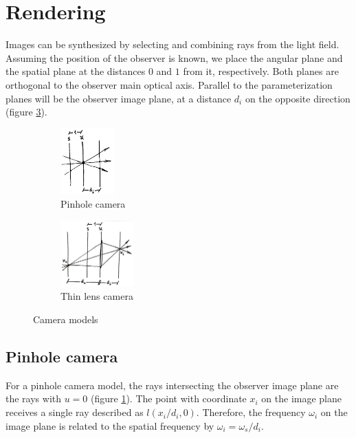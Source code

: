 \documentclass[acmtog,review,anonymous]{acmart}
\begin{document}
\section{Rendering}

Images can be synthesized by selecting and combining rays from the light field. Assuming the position of the observer is known, we place the angular plane and the spatial plane at the distances $0$ and $1$ from it, respectively. Both planes are orthogonal to the observer main optical axis. Parallel to the parameterization planes will be the observer image plane, at a distance $d_{i}$ on the opposite direction (figure \ref{fig:observer}).

\begin{figure}[h]
  \centering
  \begin{subfigure}[t]{1in}
    \centering
    \includegraphics[height=1in]{figures/pinhole}
    \caption{Pinhole camera}\label{fig:pinhole}
  \end{subfigure}
  \quad
  \begin{subfigure}[t]{1in}
    \centering
    \includegraphics[height=1in]{figures/thinlens}
    \caption{Thin lens camera}\label{fig:thinlens}
  \end{subfigure}
  \caption{Camera models}\label{fig:observer}
\end{figure}

\subsection{Pinhole camera}

For a pinhole camera model, the rays intersecting the observer image plane are the rays with $u = 0$ (figure \ref{fig:pinhole}). The point with coordinate $x_{i}$ on the image plane receives a single ray described as $l(x_{i}/d_{i}, 0)$. Therefore, the frequency $\omega_{i}$ on the image plane is related to the spatial frequency by $\omega_{i} = \omega_{s}/d_{i}$.
\end{document}
